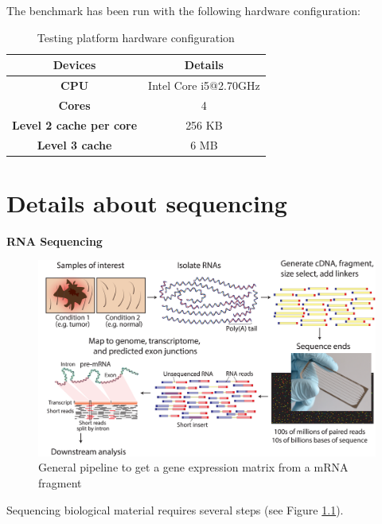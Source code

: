 \documentclass{report}
\begin{document}
The benchmark has been run with the following hardware configuration:

\begin{table}[H]
\centering
\caption{Testing platform hardware configuration}
\begin{tabular}{| c | c |}
\hline
\parbox[c]{5cm}{\textbf{Devices}} & 
\parbox[c]{5cm}{\textbf{Details}}\\
\hline
\parbox[c]{5cm}{\textbf{CPU}} & 
\parbox[c]{5cm}{Intel Core i5@2.70GHz}\\
\hline
\parbox[c]{5cm}{\textbf{Cores}} & 
\parbox[c]{5cm}{4}\\
\hline
\parbox[c]{5cm}{\textbf{Level 2 cache per core}} & 
\parbox[c]{5cm}{256 KB}\\
\hline
\parbox[c]{5cm}{\textbf{Level 3 cache}} & 
\parbox[c]{5cm}{6 MB}\\
\hline
\end{tabular}
\end{table}

\chapter{Details about sequencing}

\textbf{RNA Sequencing}
\bigskip

\begin{figure}[H]
\centering
\includegraphics[scale=1]{illustrations/sequencing.png}
\caption{General pipeline to get a gene expression matrix from a mRNA fragment}
\label{sequencing}
\end{figure}

Sequencing biological material requires several steps (see Figure \ref{sequencing}).\\
\end{document}
